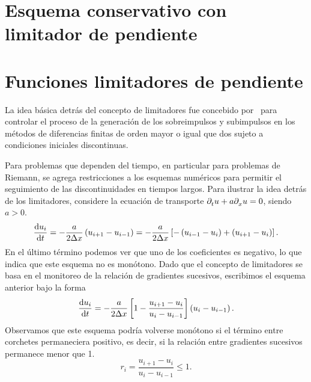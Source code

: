 
\section{Esquema conservativo con limitador de pendiente}

\section*{Funciones limitadores de pendiente}

La idea básica detrás del concepto de limitadores fue concebido
por~\cite{vanLeer2003} para controlar el proceso de la generación de
los sobreimpulsos y subimpulsos en los métodos de diferencias finitas
de orden mayor o igual que dos sujeto a condiciones iniciales
discontinuas.

Para problemas que dependen del tiempo, en particular para
problemas de Riemann, se agrega restricciones a los esquemas numéricos
para permitir el seguimiento de las discontinuidades en tiempos largos.
Para ilustrar la idea detrás de los limitadores, considere la
ecuación de transporte $\difcp{u}{t}+a\difcp{u}{x}=0$, siendo $a>0$.
\begin{equation*}
	\diff{u_{i}}{t}=
	-\frac{a}{2\Delta x}
	\left(u_{i+1}-u_{i-1}\right)=
	-\frac{a}{2\Delta x}
	\left[
		-\left(u_{i-1}-u_i\right)+
		\left(u_{i+1}-u_i\right)
		\right].
\end{equation*}
En el último término podemos ver que uno de los coeficientes es
negativo, lo que indica que este esquema no es monótono.
Dado que el concepto de limitadores se basa en el monitoreo de la
relación de gradientes sucesivos, escribimos el esquema anterior
bajo la forma
\begin{equation*}
	\diff{u_{i}}{t}=
	-\frac{a}{2\Delta x}
	\left[
	1-\frac{u_{i+1}-u_i}{u_i-u_{i-1}}
	\right]
	\left(u_i-u_{i-1}\right).
\end{equation*}
Observamos que este esquema podría volverse monótono si el término
entre corchetes permaneciera positivo, es decir, si la relación entre
gradientes sucesivos permanece menor que 1.
\begin{equation*}
	r_{i}=
	\frac{u_{i+1}-u_i}{u_i-u_{i-1}}\leq
	1.
\end{equation*}

